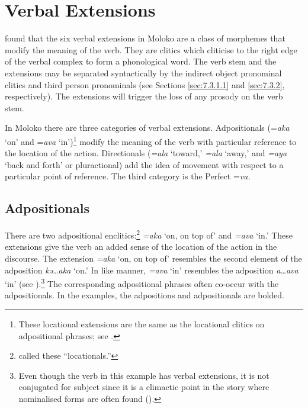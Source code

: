 \section{Verbal Extensions}\label{sec:7.5}
\hypertarget{RefHeading1212321525720847}{}
\citet{FriesenMamalis2008} found that the six verbal extensions in Moloko are a class of morphemes that modify the meaning of the verb. They are clitics which cliticise to the right edge of the verbal complex to form a phonological word.  The verb stem and the extensions may be separated syntactically by the indirect object pronominal clitics and third person \DO pronominals (see Sections \ref{sec:7.3.1.1} and \ref{sec:7.3.2}, respectively).  The extensions will trigger the loss of any prosody on the verb stem.

In Moloko there are three categories of verbal extensions.  Adpositionals (=\textit{aka} ‘on’ and =\textit{ava} ‘in’)\footnote{These locational extensions are the same as the locational clitics on adpositional phrases; see .} modify the meaning of the verb with particular reference to the location of the action. Directionals (\textit{=ala} ‘toward,’ \textit{=ala } ‘away,’ and \textit{=aya } ‘back and forth’ or pluractional) add the idea of movement with respect to a particular point of reference. The third category is the Perfect =\textit{va.} 

\subsection{Adpositionals}\label{sec:7.5.1}
\hypertarget{RefHeading1212341525720847}{}
There are two adpositional enclitics:\footnote{\citet{FriesenMamalis2008} called these ``locationals.''} \textit{=aka} ‘on, on top of’ and \textit{=ava} ‘in.’  These extensions give the verb an added sense of the location of the action in the discourse.  The extension \textit{=aka} ‘on, on top of’  resembles the second element of the adposition \textit{kə…aka} ‘on.’  In like manner, \textit{=ava} ‘in’  resembles the adposition \textit{a…ava}  ‘in’ (see ).\footnote{Even though the verb in this example has verbal extensions, it is not conjugated for subject since it is a climactic point in the story where nominalised forms are often found ().} The corresponding adpositional phrases often co-occur with the adpositionals. In the examples, the adpositions and adpositionals are bolded. 

